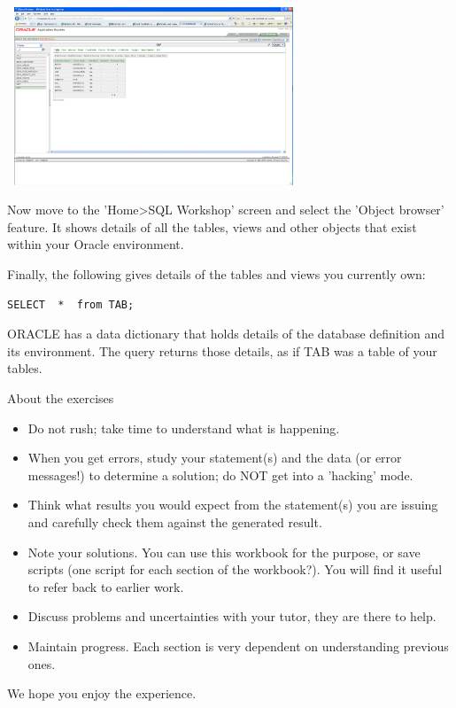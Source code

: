 \begin{center}
\includegraphics[width=8.751cm,height=5.309cm]{images/img (13).png}
\end{center}

Now move to the 'Home{\textgreater}SQL Workshop' screen and select the 'Object browser' feature. It shows details of all the tables, views and other objects that exist within your Oracle environment. 

Finally, the following gives details of the tables and views you currently own:

\begin{lstlisting}
SELECT  *  from TAB;
\end{lstlisting}

ORACLE has a data dictionary that holds details of the database definition and its environment.  The query returns those details, as if {\textquotedbl}TAB{\textquotedbl} was a table of your tables.

About the exercises

\begin{itemize}
\item Do not rush; take time to understand what is happening.
\item When you get errors, study your statement(s) and the data (or error messages!) to determine a solution; do NOT get into a 'hacking' mode.
\item Think what results you would expect from the statement(s) you are issuing and carefully check them against the generated result.
\item Note your solutions. You can use this workbook for the purpose, or save scripts (one script for each section of the workbook?).  You will find it useful to refer back to earlier work.
\item Discuss problems and uncertainties with your tutor, they are there to help.
\item Maintain progress. Each section is very dependent on understanding previous ones.
\end{itemize}
We hope you enjoy the experience.

